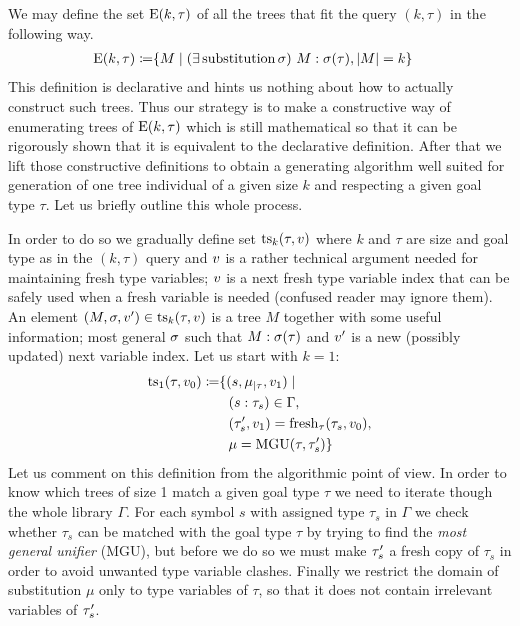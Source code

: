 \documentclass{ws-ijait}
\begin{document}
We may define the set $\operatorname{E}(k,\tau)$ of all the trees that fit the query $(k,\tau)$ in the following way.
\begin{align*}
\operatorname{E}(k,\tau) \coloneqq& \{ M \mid (\exists  \operatorname{substitution} \sigma)\  M : \sigma(\tau), \lvert M \rvert = k \}
\end{align*}
This definition is declarative and hints us nothing about how to actually construct such trees.
Thus our strategy is to make a constructive way of enumerating trees of $\operatorname{E}(k,\tau)$ 
which is still mathematical so that it can be rigorously shown that it is equivalent to the declarative definition. 
After that we lift those constructive definitions to obtain a generating algorithm well suited for generation of one tree individual of a given size $k$ and respecting a given goal type $\tau$.
Let us briefly outline this whole process.

In order to do so we gradually define set $\operatorname{ts}_{k}(\tau,v)$ where $k$ and $\tau$ are size and goal type as in the $(k,\tau)$ query and $v$ is a rather technical argument needed for maintaining fresh type variables; $v$ is a next fresh type variable index that can be safely used when a fresh variable is needed (confused reader may ignore them). An element $(M,\sigma,v^\prime) \in \operatorname{ts}_{k}(\tau,v)$ is a tree $M$ together with some useful information; most general $\sigma$ such that $M : \sigma(\tau)$ and $v^\prime$ is a new (possibly updated) next variable index. 
Let us start with $k = 1$:
\begin{align*}
\operatorname{ts}_{1}(\tau,v_0) \coloneqq&  \{ (s,{\mu}_{\mid \tau}, v_1) \mid \\
  & ~~ (s : \tau_s) \in \Gamma, \\
  & ~~ (\tau_s^\prime,v_1) = \operatorname{fresh}_{\tau}(\tau_s, v_0), \\
  & ~~ \mu = \operatorname{MGU}(\tau,\tau_s^\prime)
\}
\end{align*}
Let us comment on this definition from the algorithmic point of view. In order to know which trees of size 1 match a given goal type $\tau$ we need to iterate though the whole library $\Gamma$. 
For each symbol $s$ with assigned type $\tau_s$ in $\Gamma$ we check whether $\tau_s$ can be matched with the goal type $\tau$ by trying to find the \textit{most general unifier} (MGU), but before we do so we must make $\tau_s^\prime$ a fresh copy of $\tau_s$ in order to avoid unwanted  type variable clashes.
Finally we restrict the domain of substitution $\mu$ only to type variables of $\tau$, so that it does not contain irrelevant variables of $\tau_s^\prime$.  
\end{document}

